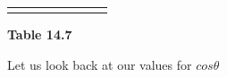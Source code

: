 \begin{center}
\begin{xtabular*}{\mytablewidth}[t]{|p{10\mystarwidth}|p{10\mystarwidth}|p{10\mystarwidth}|p{10\mystarwidth}|p{10\mystarwidth}|p{10\mystarwidth}|p{10\mystarwidth}|p{10\mystarwidth}|}
{    \addtocounter{footnote}{-0}
    
                }
     \tabularnewline{}
    \end{xtabular*}
      \end{center}
    \begin{center}{\small\bfseries Table 14.7}\end{center}
    
    \addtocounter{footnote}{-0}
    
    \par
    \label{m39414*id86892}Let us look back at our values for \begin{math}cos\theta \end{math}\par 
        
